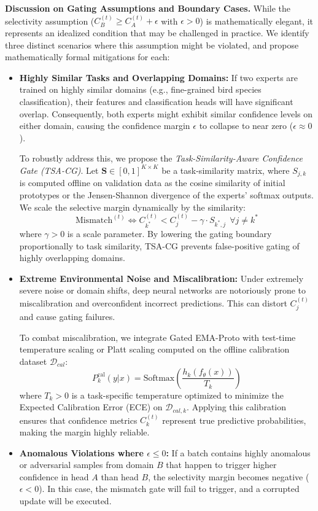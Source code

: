 \documentclass{article}
\theoremstyle{plain}
\theoremstyle{definition}
\theoremstyle{remark}
\begin{document}
\textbf{Discussion on Gating Assumptions and Boundary Cases.} While the selectivity assumption ($C_B^{(t)} \ge C_A^{(t)} + \epsilon$ with $\epsilon > 0$) is mathematically elegant, it represents an idealized condition that may be challenged in practice. We identify three distinct scenarios where this assumption might be violated, and propose mathematically formal mitigations for each:
\begin{itemize}
    \item \textbf{Highly Similar Tasks and Overlapping Domains:} If two experts are trained on highly similar domains (e.g., fine-grained bird species classification), their features and classification heads will have significant overlap. Consequently, both experts might exhibit similar confidence levels on either domain, causing the confidence margin $\epsilon$ to collapse to near zero ($\epsilon \approx 0$).
    
    To robustly address this, we propose the \textit{Task-Similarity-Aware Confidence Gate (TSA-CG)}. Let $\mathbf{S} \in [0, 1]^{K \times K}$ be a task-similarity matrix, where $S_{j,k}$ is computed offline on validation data as the cosine similarity of initial prototypes or the Jensen-Shannon divergence of the experts' softmax outputs. We scale the selective margin dynamically by the similarity:
    \begin{equation}
        \text{Mismatch}^{(t)} \!\iff\! C_{k^*}^{(t)} \!<\! C_j^{(t)} \!-\! \gamma \cdot S_{k^*, j} \ \ \forall j \!\neq\! k^*
    \end{equation}
    where $\gamma > 0$ is a scale parameter. By lowering the gating boundary proportionally to task similarity, TSA-CG prevents false-positive gating of highly overlapping domains.
    
    \item \textbf{Extreme Environmental Noise and Miscalibration:} Under extremely severe noise or domain shifts, deep neural networks are notoriously prone to miscalibration and overconfident incorrect predictions. This can distort $C_j^{(t)}$ and cause gating failures.
    
    To combat miscalibration, we integrate Gated EMA-Proto with test-time temperature scaling or Platt scaling computed on the offline calibration dataset $\mathcal{D}_{cal}$:
    \begin{equation}
        P_k^{\text{cal}}(y|x) = \text{Softmax}\left(\frac{h_k(f_\theta(x))}{T_k}\right)
    \end{equation}
    where $T_k > 0$ is a task-specific temperature optimized to minimize the Expected Calibration Error (ECE) on $\mathcal{D}_{cal, k}$. Applying this calibration ensures that confidence metrics $C_k^{(t)}$ represent true predictive probabilities, making the margin highly reliable.
    
    \item \textbf{Anomalous Violations where $\epsilon \le 0$:} If a batch contains highly anomalous or adversarial samples from domain $B$ that happen to trigger higher confidence in head $A$ than head $B$, the selectivity margin becomes negative ($\epsilon < 0$). In this case, the mismatch gate will fail to trigger, and a corrupted update will be executed.
\end{itemize}
\end{document}
